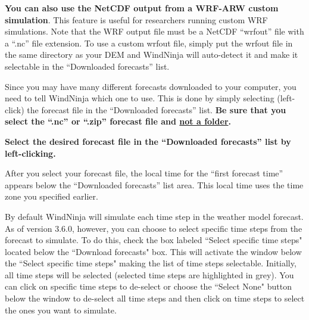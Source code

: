 \documentclass[12pt]{article}
\begin{document}
\textbf{You can also use the NetCDF output from a WRF-ARW custom simulation}. This feature is useful for researchers running custom WRF simulations. Note that the WRF output file must be a NetCDF “wrfout” file with a “.nc” file extension. To use a custom wrfout file, simply put the wrfout file in the same directory as your DEM and WindNinja will auto-detect it and make it selectable in the “Downloaded forecasts” list.

Since you may have many different forecasts downloaded to your computer, you need to tell WindNinja which one to use.  This is done by simply selecting (left-click) the forecast file in the “Downloaded forecasts” list.  \textbf{Be sure that you select the “.nc” or “.zip” forecast file and \underline{not a folder}.}

\textbf{\color{red}Select the desired forecast file in the “Downloaded forecasts” list by left-clicking.}

After you select your forecast file, the local time for the “first forecast time” appears below the “Downloaded forecasts” list area.  This local time uses the time zone you specified earlier.

By default WindNinja will simulate each time step in the weather model forecast. As of version 3.6.0, however, you can choose to select specific time steps from the forecast to simulate. To do this, check the box labeled “Select specific time steps" located below the “Download forecasts" box. This will activate the window below the “Select specific time steps" making the list of time steps selectable. Initially, all time steps will be selected (selected time steps are highlighted in grey). You can click on specific time steps to de-select or choose the “Select None" button below the window to de-select all time steps and then click on time steps to select the ones you want to simulate.
\end{document}
